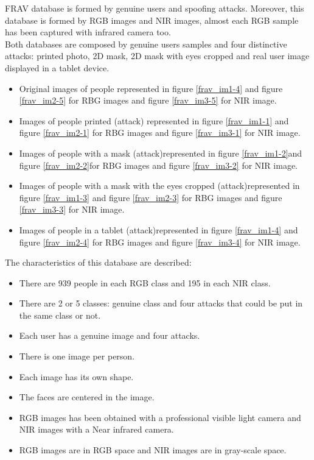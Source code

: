 FRAV database is formed by genuine users and spoofing attacks. Moreover, this database is formed by RGB images and NIR images, almost each RGB sample has been captured with infrared camera too.\\

Both databases are composed by genuine users samples and four distinctive attacks: printed photo, 2D mask, 2D mask with eyes cropped and real user image displayed in a tablet device.
\begin{itemize}[itemsep=2pt,topsep=8pt,parsep=0pt,partopsep=20pt]
 \item Original images of people represented in figure \ref{frav_im1-4} and figure \ref{frav_im2-5} for RBG images and figure \ref{frav_im3-5} for NIR image.
 \item Images of people printed (attack) represented in figure \ref{frav_im1-1} and figure \ref{frav_im2-1} for RBG images and figure \ref{frav_im3-1} for NIR image.
 \item Images of people with a mask (attack)represented in figure \ref{frav_im1-2}and figure \ref{frav_im2-2}for RBG images and figure \ref{frav_im3-2} for NIR image.
 \item Images of people with a mask with the eyes cropped (attack)represented in figure \ref{frav_im1-3} and figure \ref{frav_im2-3} for RBG images and figure \ref{frav_im3-3} for NIR image.
 \item Images of people in a tablet (attack)represented in figure \ref{frav_im1-4} and figure \ref{frav_im2-4} for RBG images and figure \ref{frav_im3-4} for NIR image.
 \end{itemize}

The characteristics of this database are described:
\begin{itemize}[itemsep=2pt,topsep=8pt,parsep=0pt,partopsep=20pt]
\item There are 939 people in each RGB class and 195 in each NIR class.
\item There are 2 or 5 classes: genuine class and four attacks that could be put in the same class or not.
\item Each user has a genuine image and four attacks.
\item There is one image per person.
\item Each image has its own shape.
\item The faces are centered in the image.
\item RGB images has been obtained with a professional visible light camera and NIR images with a Near infrared camera.
\item RGB images are in RGB space and NIR images are in gray-scale space.
\end{itemize}

